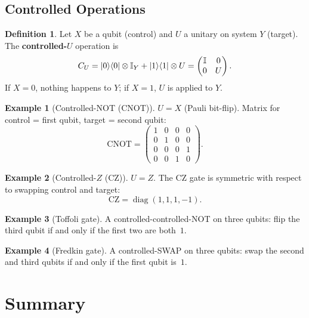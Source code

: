 \documentclass[11pt]{article}
\theoremstyle{definition}
\newtheorem{definition}{Definition}[section]
\newtheorem{example}{Example}[section]
\begin{document}
\subsection{Controlled Operations}

\begin{definition}
Let $X$ be a qubit (control) and $U$ a unitary on system $Y$ (target).  The \textbf{controlled-$U$} operation is
\[
    C_U = \ket{0}\!\bra{0}\otimes\mathbb{I}_Y + \ket{1}\!\bra{1}\otimes U
    = \begin{pmatrix}\mathbb{I}&0\\0&U\end{pmatrix}.
\]
If $X=0$, nothing happens to $Y$; if $X=1$, $U$ is applied to $Y$.
\end{definition}

\begin{example}[Controlled-NOT (CNOT)]
$U=X$ (Pauli bit-flip).  Matrix for control = first qubit, target = second qubit:
\[
    \mathrm{CNOT} = \begin{pmatrix}1&0&0&0\\0&1&0&0\\0&0&0&1\\0&0&1&0\end{pmatrix}.
\]
\end{example}

\begin{example}[Controlled-$Z$ (CZ)]
$U=Z$.  The CZ gate is symmetric with respect to swapping control and target:
\[
    \mathrm{CZ} = \operatorname{diag}(1,1,1,-1).
\]
\end{example}

\begin{example}[Toffoli gate]
A controlled-controlled-NOT on three qubits: flip the third qubit if and only if the first two are both~$1$.
\end{example}

\begin{example}[Fredkin gate]
A controlled-SWAP on three qubits: swap the second and third qubits if and only if the first qubit is~$1$.
\end{example}

\section{Summary}
\end{document}
